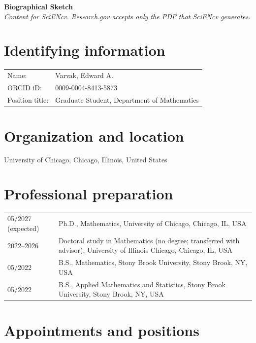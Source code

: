 \documentclass[11pt]{article}
\begin{document}
\begin{center}
  {\Large\bfseries Biographical Sketch}\\[5pt]
  \emph{Content for SciENcv. Research.gov accepts only the PDF that SciENcv generates.}
\end{center}

\section*{Identifying information}

\begin{tabularx}{\textwidth}{@{}lX@{}}
Name: & Varvak, Edward A. \\
ORCID iD: & 0009-0004-8413-5873 \\
Position title: & Graduate Student, Department of Mathematics \\
\end{tabularx}

\section*{Organization and location}

University of Chicago, Chicago, Illinois, United States

\section*{Professional preparation}

\begin{tabularx}{\textwidth}{@{}lX@{}}
05/2027 (expected) & Ph.D., Mathematics, University of Chicago, Chicago, IL, USA \\
2022--2026 & Doctoral study in Mathematics (no degree; transferred with advisor), University
of Illinois Chicago, Chicago, IL, USA \\
05/2022 & B.S., Mathematics, Stony Brook University, Stony Brook, NY, USA \\
05/2022 & B.S., Applied Mathematics and Statistics, Stony Brook University, Stony Brook,
NY, USA \\
\end{tabularx}

\section*{Appointments and positions}
\end{document}
